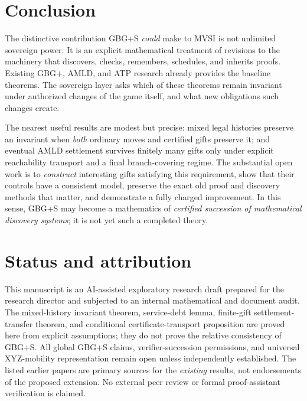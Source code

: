 \documentclass[11pt,letterpaper]{article}
\theoremstyle{remark}
\begin{document}
\section{Conclusion}
The distinctive contribution GBG+S \emph{could} make to MVSI is not unlimited sovereign power. It is an explicit mathematical treatment of revisions to the machinery that discovers, checks, remembers, schedules, and inherits proofs. Existing GBG+, AMLD, and ATP research already provides the baseline theorems. The sovereign layer asks which of these theorems remain invariant under authorized changes of the game itself, and what new obligations such changes create.

The nearest useful results are modest but precise: mixed legal histories preserve an invariant when \emph{both} ordinary moves and certified gifts preserve it; and eventual AMLD settlement survives finitely many gifts only under explicit reachability transport and a final branch-covering regime. The substantial open work is to \emph{construct} interesting gifts satisfying this requirement, show that their controls have a consistent model, preserve the exact old proof and discovery methods that matter, and demonstrate a fully charged improvement. In this sense, GBG+S may become a mathematics of \emph{certified succession of mathematical discovery systems}; it is not yet such a completed theory.

\section*{Status and attribution}
This manuscript is an AI-assisted exploratory research draft prepared for the research director and subjected to an internal mathematical and document audit. The mixed-history invariant theorem, service-debt lemma, finite-gift settlement-transfer theorem, and conditional certificate-transport proposition are proved here from explicit assumptions; they do not prove the relative consistency of GBG+S. All global GBG+S claims, verifier-succession permissions, and universal XYZ-mobility representation remain open unless independently established. The listed earlier papers are primary sources for the \emph{existing} results, not endorsements of the proposed extension. No external peer review or formal proof-assistant verification is claimed.
\end{document}
